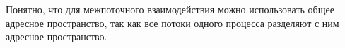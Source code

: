Понятно, что для межпоточного взаимодействия можно использовать общее адресное пространство, так как все потоки одного процесса разделяют с ним адресное пространство.